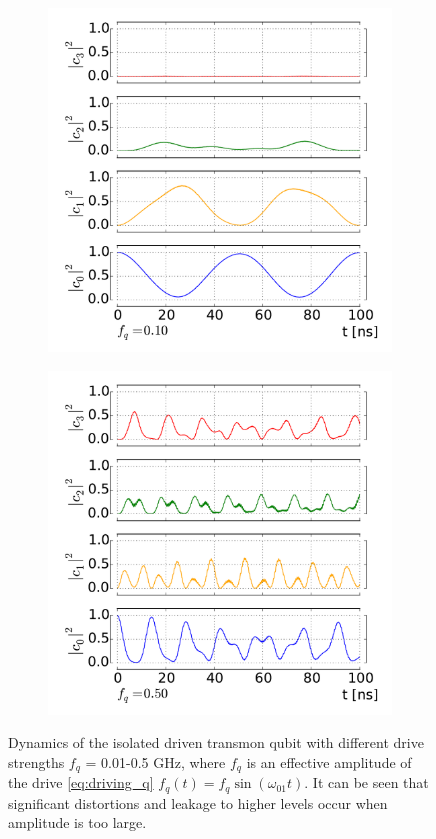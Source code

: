 \documentclass[12pt]{report}
\numberwithin{equation}{section}
\begin{document}
\begin{figure}[h!]
\begin{subfigure}[t]{0.45\textwidth}
\includegraphics[width=\textwidth]{tr_str_dr}
\end{subfigure}
\begin{subfigure}[t]{0.45\textwidth}
\includegraphics[width=\textwidth]{tr_vstr_dr}
\end{subfigure}
\caption{Dynamics of the isolated driven transmon qubit with different drive strengths $f_q$ = 0.01-0.5 GHz, where $f_q$ is an effective amplitude of the drive \eqref{eq:driving_q} $f_q (t) = f_q \sin(\omega_{01} t)$. It can be seen that significant distortions and leakage to higher levels occur when amplitude is too large.}
\label{eq:driven_tr}
\end{figure}
\end{document}
